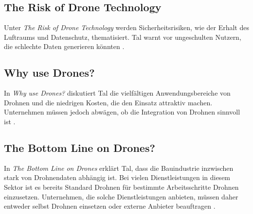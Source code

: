 \subsection{The Risk of Drone Technology}
Unter \textit{The Risk of Drone Technology} werden Sicherheitsrisiken, wie der Erhalt des Luftraums und Datenschutz, thematisiert.
Tal warnt vor ungeschulten Nutzern, die schlechte Daten generieren könnten \cite[pp. 17-18]{Tal2021} \cite[p. 20]{Tal2021}.

\subsection{Why use Drones?}
In \textit{Why use Drones?} diskutiert Tal die vielfältigen Anwendungsbereiche von Drohnen und die niedrigen Kosten, die den Einsatz attraktiv machen. Unternehmen müssen jedoch abwägen, ob die Integration von Drohnen sinnvoll ist \cite[p. 21]{Tal2021}.

\subsection{The Bottom Line on Drones?}
In \textit{The Bottom Line on Drones} erklärt Tal, dass die Bauindustrie inzwischen stark von Drohnendaten abhängig ist.
Bei vielen Dienstleistungen in diesem Sektor ist es bereits Standard Drohnen für bestimmte Arbeitsschritte Drohnen einzusetzen.
Unternehmen, die solche Dienstleistungen anbieten, müssen daher entweder selbst Drohnen einsetzen oder externe Anbieter beauftragen \cite[p. 22]{Tal2021}.

